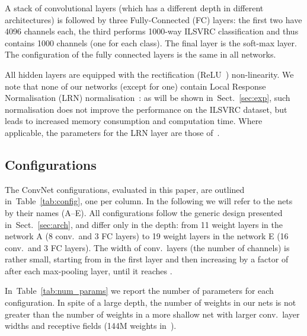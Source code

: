 \documentclass{article} \usepackage{iclr2015,times}
\newcommand{\tblref}[1]{Table~\ref{#1}}
\newcommand{\sref}[1]{Sect.~\ref{#1}}
\begin{document}
A stack of convolutional layers (which has a different depth in different architectures) is followed by three Fully-Connected (FC) layers: the first
two have 4096 channels each, the third performs 1000-way ILSVRC classification and thus contains 1000 channels (one for each class). The final layer is the soft-max layer.
The configuration of the fully connected layers is the same in all networks. 

All hidden layers are equipped with the rectification (ReLU~\citep{Krizhevsky12}) non-linearity. 
We note that none of our networks (except for one) contain Local Response Normalisation (LRN) normalisation~\citep{Krizhevsky12}: as will be shown in~\sref{sec:exp}, such normalisation 
does not improve the performance on the ILSVRC dataset, but leads to increased memory consumption and computation time. 
Where applicable, the parameters for the LRN layer are those of~\citep{Krizhevsky12}.

\subsection{Configurations}
\label{sec:config}
The ConvNet configurations, evaluated in this paper, are outlined in~\tblref{tab:config}, one per column. In the following we will refer to the nets by their names 
(A--E). All configurations follow the generic design presented in~\sref{sec:arch}, and differ only in the depth: 
from 11 weight layers in the network A (8 conv.\ and 3 FC layers) to 19 weight layers in the network E (16 conv.\ and 3 FC layers).
The width of conv.\ layers (the number of channels) is rather small, starting from  in the first layer and then increasing by a factor of  after each max-pooling layer,
until it reaches .

In~\tblref{tab:num_params} we report the number of parameters for each configuration.
In spite of a large depth, the number of weights in our nets is not greater than the number of weights in a more shallow net with larger conv.\ layer widths and receptive fields
(144M weights in~\citep{Sermanet14}).
\end{document}
